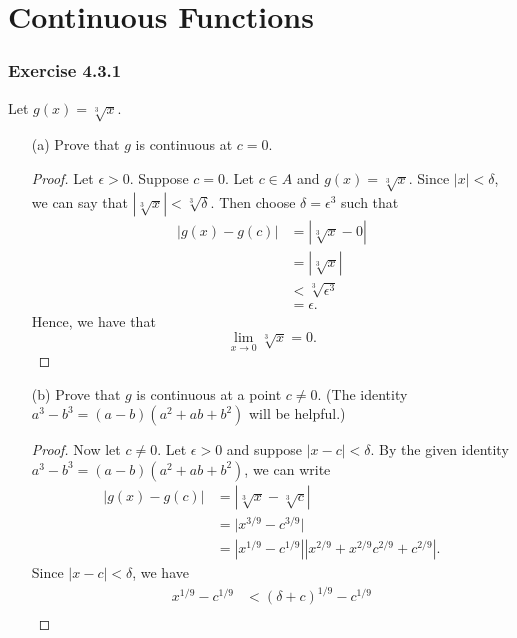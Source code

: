 \section{Continuous Functions}

\subsubsection{Exercise 4.3.1} Let \( g(x) = \sqrt[3]{x }  \).
\begin{enumerate}
    \item[(a)] Prove that \( g \) is continuous at \( c = 0  \).
        \begin{proof}
            Let \( \epsilon > 0  \). Suppose \( c = 0  \). Let \( c \in A  \) and \( g(x) = \sqrt[3]{ x }  \). Since \( | x | < \delta  \), we can say that \( |\sqrt[3]{ x }| < \sqrt[3]{ \delta }   \). Then choose \( \delta = \epsilon^3 \) such that 
            \begin{align*}
                | g(x)  - g(c) | &= | \sqrt[3]{ x } - 0  |  \\
                                 &= | \sqrt[3]{ x }  |  \\
                                 &< \sqrt[3]{ \epsilon^3 } \\
                                 &= \epsilon.
            \end{align*}
            Hence, we have that 
            \[  \lim_{ x \to 0 } \sqrt[3]{ x } = 0 . \]
        \end{proof}
    \item[(b)] Prove that \( g  \) is continuous at a point \( c \neq 0  \). (The identity \( a^3 - b^3 = (a-b)(a^2 + ab + b^2)  \) will be helpful.)
        \begin{proof}
        Now let \( c \neq  0  \). Let \( \epsilon > 0  \) and suppose \( | x - c  | < \delta \). By the given identity \( a^3 - b^3 = (a-b)(a^2 +ab +b^2) \), we can write 
        \begin{align*}
            | g(x) - g(c) | &= | \sqrt[3]{x} - \sqrt[3]{c}     |  \\
                            &= \Big| x^{3/9} - c^{3/9} \Big| \\  
                            &= | x^{1/9} - c^{1/9} | | x^{2/9} + x^{2/9}c^{2/9} + c^{2/9} |.
        \end{align*}
        Since \( | x - c  | < \delta \), we have 
        \begin{align*}
            x^{1/9} - c^{1/9}  &< (\delta + c)^{1/9} - c^{1/9} \tag{1}  \\

\end{align*}
\end{proof}
\end{enumerate}
